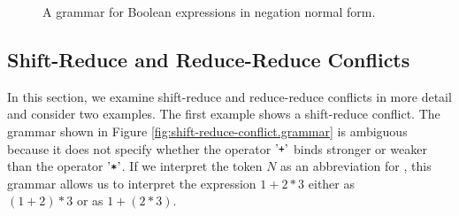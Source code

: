 \begin{figure}[htbp]
  \begin{center}
  \end{center}
  \caption{A grammar for Boolean expressions in negation normal form.}
  \label{fig:BoolExpr.grammar}
\end{figure}


\subsection{Shift-Reduce and Reduce-Reduce Conflicts}
In this section, we examine shift-reduce and reduce-reduce conflicts in more detail and consider two examples. The first example shows a shift-reduce conflict. 
The grammar shown in Figure \ref{fig:shift-reduce-conflict.grammar} is ambiguous because it does not specify whether the operator \(\mbox{'\texttt{+}'}\) binds stronger or weaker than the operator \(\mbox{'\texttt{*}'}\). If we interpret the token \(N\) as an abbreviation for , this grammar allows us to interpret the expression \(1 + 2 * 3\) either as 
\\[0.2cm]
\hspace*{1.3cm}
\((1 + 2) * 3\) \quad or as \quad \(1 + (2 * 3)\).
\\[0.2cm]
  
